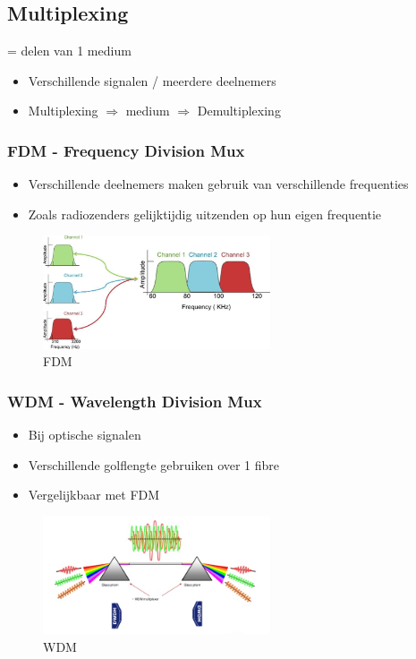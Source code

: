 \documentclass{article}
\begin{document}
\subsection{Multiplexing}
= delen van 1 medium

\begin{itemize}
    \item Verschillende signalen / meerdere deelnemers
    \item Multiplexing $\Rightarrow$ medium $\Rightarrow$ Demultiplexing
\end{itemize}

\subsubsection{FDM - Frequency Division Mux}

\begin{itemize}
    \item Verschillende deelnemers maken gebruik van verschillende frequenties
    \item Zoals radiozenders gelijktijdig uitzenden op hun eigen frequentie
\end{itemize}

\begin{figure}[H]
    \centering
    \includegraphics[width=0.6\textwidth]{fdm.jpg}
    \caption{FDM}
\end{figure}

\subsubsection{WDM - Wavelength Division Mux}
\begin{itemize}
    \item Bij optische signalen
    \item Verschillende golflengte gebruiken over 1 fibre
    \item Vergelijkbaar met FDM
\end{itemize}

\begin{figure}[H]
    \centering
    \includegraphics[width=0.6\textwidth]{wdm.png} 
    \caption{WDM}
\end{figure}
\end{document}
